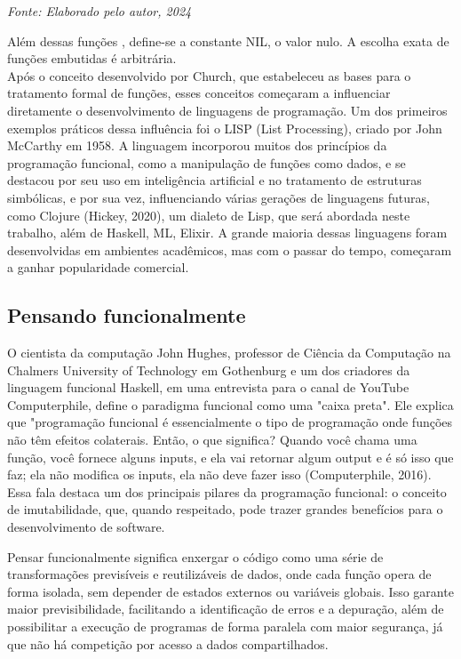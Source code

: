 \begin{center}
    \textit{Fonte: Elaborado pelo autor, 2024} %
\end{center}

Além dessas funções , define-se a constante NIL, o valor nulo. A escolha exata de funções embutidas é arbitrária.\\


Após o conceito desenvolvido por Church, que estabeleceu as bases para o tratamento formal de funções, esses conceitos começaram a influenciar diretamente o desenvolvimento de linguagens de programação. Um dos primeiros exemplos práticos dessa influência foi o LISP (List Processing), criado por John McCarthy em 1958. A linguagem incorporou muitos dos princípios da programação funcional, como a manipulação de funções como dados, e se destacou por seu uso em inteligência artificial e no tratamento de estruturas simbólicas, e por sua vez, influenciando várias gerações de linguagens futuras, como Clojure (Hickey, 2020), um dialeto de Lisp, que será abordada neste trabalho, além de Haskell, ML, Elixir. A grande maioria dessas linguagens foram desenvolvidas em ambientes acadêmicos, mas com o passar do tempo, começaram a ganhar popularidade comercial.

\subsection{Pensando funcionalmente}
O cientista da computação John Hughes, professor de Ciência da Computação na Chalmers University of Technology em Gothenburg e um dos criadores da linguagem funcional Haskell, em uma entrevista para o canal de YouTube Computerphile, define o paradigma funcional como uma "caixa preta". Ele explica que "programação funcional é essencialmente o tipo de programação onde funções não têm efeitos colaterais. Então, o que significa? Quando você chama uma função, você fornece alguns inputs, e ela vai retornar algum output e é só isso que faz; ela não modifica os inputs, ela não deve fazer isso (Computerphile, 2016). Essa fala destaca um dos principais pilares da programação funcional: o conceito de imutabilidade, que, quando respeitado, pode trazer grandes benefícios para o desenvolvimento de software.

Pensar funcionalmente significa enxergar o código como uma série de transformações previsíveis e reutilizáveis de dados, onde cada função opera de forma isolada, sem depender de estados externos ou variáveis globais. Isso garante maior previsibilidade, facilitando a identificação de erros e a depuração, além de possibilitar a execução de programas de forma paralela com maior segurança, já que não há competição por acesso a dados compartilhados.

